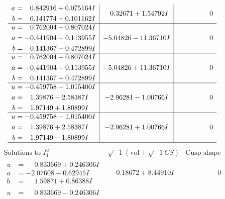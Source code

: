 \documentclass[1p]{elsarticle_modified}
\theoremstyle{definition}
\newcommand{\I}{\sqrt{-1}}
\begin{document}
$$\begin{array}{c|c|c}
\begin{aligned}
a &= \phantom{-}0.842916 + 0.075164 I \\
b &= \phantom{-}0.141774 + 0.101162 I\end{aligned}
 & \phantom{-}0.32671 + 1.54792 I & \phantom{-0.000000 } 0 \\ \hline\begin{aligned}
u &= \phantom{-}0.762004 + 0.807024 I \\
a &= -0.441904 - 0.113955 I \\
b &= \phantom{-}0.141367 - 0.472899 I\end{aligned}
 & -5.04826 - 11.36710 I & \phantom{-0.000000 } 0 \\ \hline\begin{aligned}
u &= \phantom{-}0.762004 - 0.807024 I \\
a &= -0.441904 + 0.113955 I \\
b &= \phantom{-}0.141367 + 0.472899 I\end{aligned}
 & -5.04826 + 11.36710 I & \phantom{-0.000000 } 0 \\ \hline\begin{aligned}
u &= -0.459758 + 1.015400 I \\
a &= \phantom{-}1.39876 - 2.58387 I \\
b &= \phantom{-}1.97149 + 1.80899 I\end{aligned}
 & -2.96281 - 1.00766 I & \phantom{-0.000000 } 0 \\ \hline\begin{aligned}
u &= -0.459758 - 1.015400 I \\
a &= \phantom{-}1.39876 + 2.58387 I \\
b &= \phantom{-}1.97149 - 1.80899 I\end{aligned}
 & -2.96281 + 1.00766 I & \phantom{-0.000000 } 0\\
 \hline 
 \end{array}$$\newpage$$\begin{array}{c|c|c}  
\text{Solutions to }I^u_{1}& \I (\text{vol} + \sqrt{-1}CS) & \text{Cusp shape}\\
 \hline 
\begin{aligned}
u &= \phantom{-}0.833669 + 0.246306 I \\
a &= -2.07608 - 0.62945 I \\
b &= \phantom{-}1.59871 + 0.86388 I\end{aligned}
 & \phantom{-}0.18672 + 8.44910 I & \phantom{-0.000000 } 0 \\ \hline\begin{aligned}
u &= \phantom{-}0.833669 - 0.246306 I \\

\end{aligned}
\end{array}$$
\end{document}
